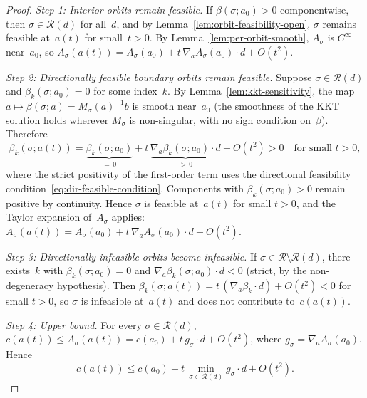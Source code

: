 \begin{unverified}
\begin{proof}
\emph{Step 1: Interior orbits remain feasible.}
If $\beta(\sigma; a_0) > 0$ componentwise, then
$\sigma \in \mathcal{R}(d)$ for all~$d$, and by
Lemma~\ref{lem:orbit-feasibility-open},
$\sigma$ remains feasible at~$a(t)$ for small~$t > 0$.
By Lemma~\ref{lem:per-orbit-smooth}, $A_\sigma$ is $C^\infty$
near~$a_0$, so
$A_\sigma(a(t)) = A_\sigma(a_0) + t\,\nabla_a A_\sigma(a_0) \cdot d + O(t^2)$.

\emph{Step 2: Directionally feasible boundary orbits remain feasible.}
Suppose $\sigma \in \mathcal{R}(d)$ and
$\beta_k(\sigma; a_0) = 0$ for some index~$k$.
By Lemma~\ref{lem:kkt-sensitivity}, the map
$a \mapsto \beta(\sigma; a) = M_\sigma(a)^{-1} b$
is smooth near~$a_0$ (the smoothness of the KKT solution holds
wherever $M_\sigma$ is non-singular, with no sign condition
on~$\beta$).
Therefore
\[
  \beta_k(\sigma; a(t))
  = \underbrace{\beta_k(\sigma; a_0)}_{=\,0}
  + t\,\underbrace{\nabla_a \beta_k(\sigma; a_0) \cdot d}_{>\, 0}
  + O(t^2)
  > 0 \quad \text{for small } t > 0,
\]
where the strict positivity of the first-order term uses
the directional feasibility condition~\eqref{eq:dir-feasible-condition}.
Components with $\beta_k(\sigma; a_0) > 0$ remain positive by
continuity.
Hence $\sigma$ is feasible at~$a(t)$ for small $t > 0$,
and the Taylor expansion of~$A_\sigma$ applies:
$A_\sigma(a(t)) = A_\sigma(a_0) + t\,\nabla_a A_\sigma(a_0) \cdot d + O(t^2)$.

\emph{Step 3: Directionally infeasible orbits become infeasible.}
If $\sigma \in \mathcal{R} \setminus \mathcal{R}(d)$,
there exists~$k$ with $\beta_k(\sigma; a_0) = 0$ and
$\nabla_a \beta_k(\sigma; a_0) \cdot d < 0$
(strict, by the non-degeneracy hypothesis).
Then $\beta_k(\sigma; a(t)) = t\,(\nabla_a \beta_k \cdot d) + O(t^2) < 0$
for small $t > 0$, so $\sigma$ is infeasible at~$a(t)$
and does not contribute to~$c(a(t))$.

\emph{Step 4: Upper bound.}
For every $\sigma \in \mathcal{R}(d)$,
$c(a(t)) \leq A_\sigma(a(t))
= c(a_0) + t\,g_\sigma \cdot d + O(t^2)$,
where $g_\sigma = \nabla_a A_\sigma(a_0)$.
Hence
\[
  c(a(t)) \leq c(a_0)
  + t\,\min_{\sigma \in \mathcal{R}(d)} g_\sigma \cdot d
  + O(t^2).
\]


\end{proof}
\end{unverified}
